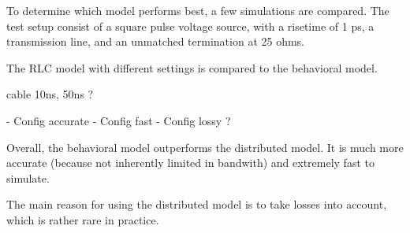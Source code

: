 To determine which model performs best, a few simulations are compared.
The test setup consist of a square pulse voltage source, with a risetime of 1 ps, a transmission line, and an unmatched termination at 25 ohms.

The RLC model with different settings is compared to the behavioral model.

cable 10ns, 50ns ?

- Config accurate
- Config fast
- Config lossy ?

Overall, the behavioral model outperforms the distributed model.
It is much more accurate (because not inherently limited in bandwith) and extremely fast to simulate.

The main reason for using the distributed model is to take losses into account, which is rather rare in practice.
